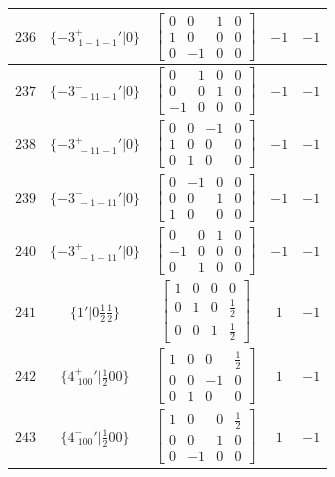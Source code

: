 \documentclass[fleqn,8pt]{jsarticle}
\begin{document}
\begin{longtable}{ccccc}
$ 236 $ & $ \{-3^{+}_{\,\,1-1-1}{}'|0\} $ & $ \begin{bmatrix} 0 & 0 & 1 & 0 \\ 1 & 0 & 0 & 0 \\ 0 & -1 & 0 & 0 \end{bmatrix} $ & $ -1 $ & $ -1 $ \\ \hline
$ 237 $ & $ \{-3^{-}_{\,\,-11-1}{}'|0\} $ & $ \begin{bmatrix} 0 & 1 & 0 & 0 \\ 0 & 0 & 1 & 0 \\ -1 & 0 & 0 & 0 \end{bmatrix} $ & $ -1 $ & $ -1 $ \\ \hline
$ 238 $ & $ \{-3^{+}_{\,\,-11-1}{}'|0\} $ & $ \begin{bmatrix} 0 & 0 & -1 & 0 \\ 1 & 0 & 0 & 0 \\ 0 & 1 & 0 & 0 \end{bmatrix} $ & $ -1 $ & $ -1 $ \\ \hline
$ 239 $ & $ \{-3^{-}_{\,\,-1-11}{}'|0\} $ & $ \begin{bmatrix} 0 & -1 & 0 & 0 \\ 0 & 0 & 1 & 0 \\ 1 & 0 & 0 & 0 \end{bmatrix} $ & $ -1 $ & $ -1 $ \\ \hline
$ 240 $ & $ \{-3^{+}_{\,\,-1-11}{}'|0\} $ & $ \begin{bmatrix} 0 & 0 & 1 & 0 \\ -1 & 0 & 0 & 0 \\ 0 & 1 & 0 & 0 \end{bmatrix} $ & $ -1 $ & $ -1 $ \\ \hline
$ 241 $ & $ \{1{}'|0 \frac{1}{2} \frac{1}{2}\} $ & $ \begin{bmatrix} 1 & 0 & 0 & 0 \\ 0 & 1 & 0 & \frac{1}{2} \\ 0 & 0 & 1 & \frac{1}{2} \end{bmatrix} $ & $ 1 $ & $ -1 $ \\ \hline
$ 242 $ & $ \{4^{+}_{\,\,100}{}'|\frac{1}{2} 0 0\} $ & $ \begin{bmatrix} 1 & 0 & 0 & \frac{1}{2} \\ 0 & 0 & -1 & 0 \\ 0 & 1 & 0 & 0 \end{bmatrix} $ & $ 1 $ & $ -1 $ \\ \hline
$ 243 $ & $ \{4^{-}_{\,\,100}{}'|\frac{1}{2} 0 0\} $ & $ \begin{bmatrix} 1 & 0 & 0 & \frac{1}{2} \\ 0 & 0 & 1 & 0 \\ 0 & -1 & 0 & 0 \end{bmatrix} $ & $ 1 $ & $ -1 $ \\ \hline

\end{longtable}
\end{document}
